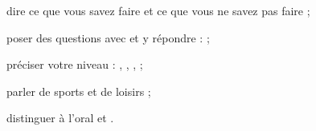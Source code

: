 
\newcommand{\otIllusUnXII}{\otIllusDuo{swim/104/86/15/0.10,ski/190/92/20/0.09,sing/122/14/13/0.08,
  dance/150/8/11/0.08,run/196/22/12/0.07,cook/100/50/12/0.07}{emma}{Can you swim?}{lea}{Yes, I can!}}

\newcommand{\otTalents}{%
  \begin{center}\otTableau
  \begin{tabular}{@{}l@{\hspace{10mm}}c@{\hspace{10mm}}c@{\hspace{10mm}}c@{\hspace{10mm}}c@{}}
   & \otTH{swim} & \otTH{ski} & \otTH{cook} & \otTH{play the guitar}\\\midrule
  \otNomDit{lea}  & \otCheck & \otCheck & \otCheck & \otCroix\\[1mm]
  \otNomDit{jack} & \otCheck & \otCroix & \otCroix & \otCheck\\[1mm]
  \otNomDit{emma} & \otCroix & \otCheck & \otCheck & \otCroix\\\bottomrule
  \end{tabular}\end{center}}



\begin{objectifs}
\item dire ce que vous savez faire et ce que vous ne savez pas faire ;
\item poser des questions avec  et y répondre :  ;
\item préciser votre niveau : , , ,  ;
\item parler de sports et de loisirs ;
\item distinguer à l'oral   et  .
\end{objectifs}

